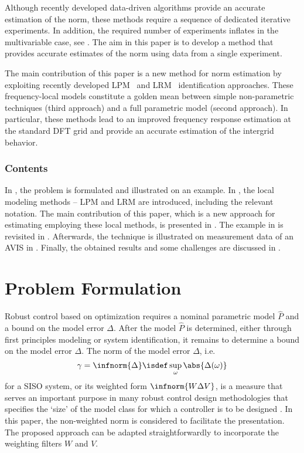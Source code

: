Although recently developed data-driven algorithms provide an accurate estimation of the \Hinf{} norm, these methods require a sequence of dedicated iterative experiments. 
In addition, the required number of experiments inflates in the multivariable case, see \cite{Oomen2014ILH}. 
The aim in this paper is to develop a method that provides accurate estimates of the \Hinf{} norm using data from a single experiment. 

The main contribution of this paper is a new method for \Hinf{} norm estimation by exploiting recently developed \gls{LPM}~\citep{Schoukens2009LPM} and \gls{LRM}~\citep{McKelvey2012LRM} identification approaches.
These frequency-local models constitute a golden mean between simple non-parametric techniques (third approach) and a full parametric model (second approach). 
In particular, these methods lead to an improved frequency response estimation at the standard \gls{DFT} grid and provide an accurate estimation of the intergrid behavior. 

\subsubsection{Contents}
\label{par:toc}
In , the problem is formulated and illustrated on an example.
In , the local modeling methods -- \gls{LPM} and \gls{LRM} are introduced, including the relevant notation.
The main contribution of this paper, which is a new approach for estimating \norm{\Delta} employing these local methods, is presented in . The example in  is revisited in .
Afterwards, the technique is illustrated on measurement data of an \gls{AVIS} in .
Finally, the obtained results and some challenges are discussed in .

\glsresetall %

\section{Problem Formulation}
\label{sec:Problem}
Robust control based on \Hinf{} optimization requires a nominal parametric model $\hat P$ and a bound on the model error $\Delta$. 
After the model $\hat P$ is determined, either through first principles modeling or system identification, it remains to determine a bound on the model error $\Delta$. 
The \Hinf{} norm of the model error $\Delta$, i.e.
\begin{equation}
  \gamma = \infnorm{\Delta} \isdef \sup_{\omega} \abs{\Delta(\omega)}
  \label{eq:HinfNormSISO}
\end{equation}
for a \gls{SISO} system, or its weighted form $\infnorm{W \Delta V}$, is a measure that serves an important purpose in many robust control design methodologies that specifies the `size' of the model class for which a controller is to be designed \citep{Skogestad2005,Oomen2012SIRP}.
In this paper, the non-weighted \Hinf{} norm is considered to facilitate the presentation. 
The proposed approach can be adapted straightforwardly to incorporate the weighting filters $W$ and $V$.

